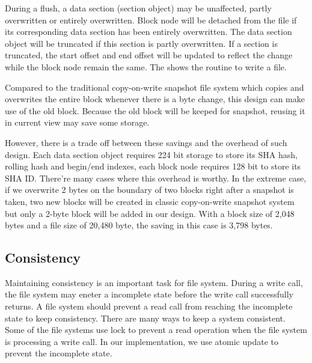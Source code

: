     During a flush, a data section (section object) may be unaffected, partly overwritten or entirely overwritten. Block node will be detached from the file if its corresponding data section has been entirely overwritten. The data section object will be truncated if this section is partly overwritten. If a section is truncated, the start offset and end offset will be updated to reflect the change while the block node remain the same. The  shows the routine to write a file.

    Compared to the traditional copy-on-write snapshot file system which copies and overwrites the entire block whenever there is a byte change, this design can make use of the old block. Because the old block will be keeped for snapshot, reusing it in current view may save some storage.

    However, there is a trade off between these savings and the overhead of such design. Each data section object requires 224 bit storage to store its SHA hash, rolling hash and begin/end indexes, each block node requires 128 bit to store its SHA ID. There're many cases where this overhead is worthy. In the extreme case, if we overwrite 2 bytes on the boundary of two blocks right after a snapshot is taken, two new blocks will be created in classic copy-on-write snapshot system but only a 2-byte block will be added in our design. With a block size of 2,048 bytes and a file size of 20,480 byte, the saving in this case is 3,798 bytes.

\subsection{Consistency}

    Maintaining consistency is an important task for file system. During a write call, the file system may eneter a incomplete state before the write call successfully returns. A file system should prevent a read call from reaching the incomplete state to keep consistency. There are many ways to keep a system consistent. Some of the file systems use lock to prevent a read operation when the file system is processing a write call. In our implementation, we use atomic update to prevent the incomplete state.

